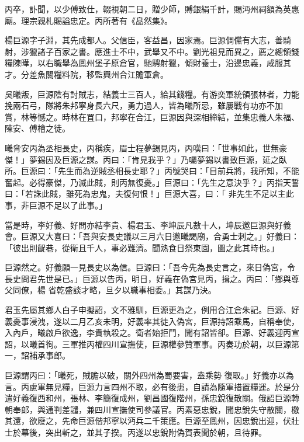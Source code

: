 \begin{pinyinscope}
 丙卒，訃聞，以少傅致仕，輟視朝二日，贈少師，賻銀絹千計，賜沔州祠額為英惠廟。理宗親札賜謚忠定。丙所著有《皛然集》。



 楊巨源字子淵，其先成都人。父信臣，客益昌，因家焉。巨源倜儻有大志，善騎射，涉獵諸子百家之書。應進士不中，武舉又不中。劉光祖見而異之，薦之總領錢糧陳曄，以右職舉為鳳州堡子原倉官，馳騁射獵，傾財養士，沿邊忠義，咸服其才。分差魚關糧料院，移監興州合江贍軍倉。



 吳曦叛，巨源陰有討賊志，結義士三百人，給其錢糧。有游奕軍統領張林者，力能挽兩石弓，隊將朱邦寧身長六尺，勇力過人，皆為曦所忌，雖屢戰有功亦不加
 賞，林等憾之。時林在罝口，邦寧在合江，巨源因與深相締結，並集忠義人朱福、陳安、傅檜之徒。



 曦脅安丙為丞相長史，丙稱疾，眉士程夢錫見丙，丙嘆曰：「世事如此，世無豪傑！」夢錫因及巨源之謀。丙曰：「肯見我乎？」乃囑夢錫以書致巨源，延之臥所。巨源曰：「先生而為逆賊丞相長史耶？」丙號哭曰：「目前兵將，我所知，不能奮起。必得豪傑，乃滅此賊，則丙無復憂。」巨源曰：「先生之意決乎？」丙指天誓曰：「若誅此賊，雖死為忠鬼，夫復何恨！」巨源大喜，曰：「
 非先生不足以主此事，非巨源不足以了此事。」



 當是時，李好義、好問亦結李貴、楊君玉、李坤辰凡數十人，坤辰邀巨源與好義會。巨源又大喜曰：「吾與安長史議以三月六日邀曦謁廟，合勇士刺之。」好義曰：「彼出則齪巷，從衛且千人，事必難濟。聞熟食日祭東園，圖之此其時也。」



 巨源然之。好義願一見長史以為信。巨源曰：「吾今先為長史言之，來日偽宮，令長史問君先世是已。」巨源以告丙，明日，好義在偽宮見丙，揖之。丙曰：「鄉與尊父同僚，楊
 省乾盛談才略，旦夕以職事相委。」其謀乃決。



 君玉先屬其鄉人白子申擬詔，文不雅馴，巨源更為之，例用合江倉朱記。巨源、好義憂事浸洩，遂以二月乙亥未明，好義率其徒入偽宮，巨源持詔乘馬，自稱奉使，入內戶，曦啟戶欲逸，李貴執殺之。衛者始拒鬥，聞有詔皆卻。巨源、好義迎丙宣詔，以曦首徇。三軍推丙權四川宣撫使，巨源權參贊軍事。丙奏功於朝，以巨源第一，詔補承事郎。



 巨源謂丙曰：「曦死，賊膽以破，關外四州為蜀要害，盍乘勢
 復取。」好義亦以為言。丙慮軍無見糧，巨源力言四州不取，必有後患，自請為隨軍措置糧運。於是分遣好義復西和州，張林、李簡復成州，劉昌國復階州，孫忠銳復散關。俄詔巨源轉朝奉郎，與通判差譴，兼四川宣撫使司參議官。丙素惡忠銳，聞忠銳失守散關，檄其還，欲廢之，先命巨源偕邦寧以沔兵二千策應。巨源至鳳州，因忠銳出迎，伏壯士於幕後，突出斬之，並其子揆。丙遂以忠銳附偽賀表聞於朝，且待罪。




\end{pinyinscope}
